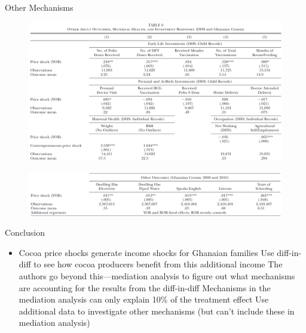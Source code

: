 \documentclass[dvipsnames]{beamer}
\begin{document}
    \begin{frame}{Other Mechanisms}
      \begin{figure}[htp]
        \centering
       \includegraphics[width=\textwidth, keepaspectratio=true]{tab6-1.png} 
      \end{figure}
      \vspace{-1em}
      \begin{figure}[htp]
        \centering
       \includegraphics[width=\textwidth, keepaspectratio=true]{tab6-2.png} 
      \end{figure}
    \end{frame}
    \begin{frame}{Conclusion}
      \begin{itemize}
      \item Cocoa price shocks generate income shocks for Ghanaian families
        \vitem Use diff-in-diff to see how cocoa producers benefit from this additional income
        \vitem The authors go beyond this---mediation analysis to figure out what mechanisms are accounting for the results from the diff-in-diff
        \vitem Mechanisms in the mediation analysis can only explain 10\% of the treatment effect
        \vitem Use additional data to investigate other mechanisms (but can't include these in mediation analysis)
      \end{itemize}
    \end{frame}
\end{document}
